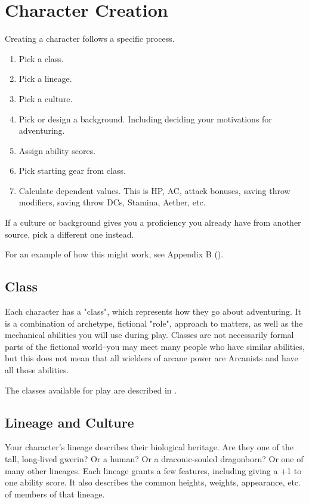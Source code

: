 \chapter{Character Creation}
\label{ch:character-creation}
Creating a character follows a specific process.
\begin{enumerate}
    \item Pick a class.
    \item Pick a lineage.
    \item Pick a culture.
    \item Pick or design a background. Including deciding your motivations for adventuring.
    \item Assign ability scores.
    \item Pick starting gear from class.
    \item Calculate dependent values. This is HP, AC, attack bonuses, saving throw modifiers, saving throw DCs, Stamina, Aether, etc.
\end{enumerate}

If a culture or background gives you a proficiency you already have from another source, pick a different one instead.

For an example of how this might work, see Appendix B ().

\section{Class}
Each character has a "class", which represents how they go about adventuring. It is a combination of archetype, fictional "role", approach to matters, as well as the mechanical abilities you will use during play. Classes are not necessarily formal parts of the fictional world--you may meet many people who have similar abilities, but this does not mean that all wielders of arcane power are Arcanists and have all those abilities.

The classes available for play are described in .

\section{Lineage and Culture}
Your character's lineage describes their biological heritage. Are they one of the tall, long-lived gwerin? Or a human? Or a draconic-souled dragonborn? Or one of many other lineages. Each lineage grants a few features, including giving a +1 to one ability score. It also describes the common heights, weights, appearance, etc. of members of that lineage.

